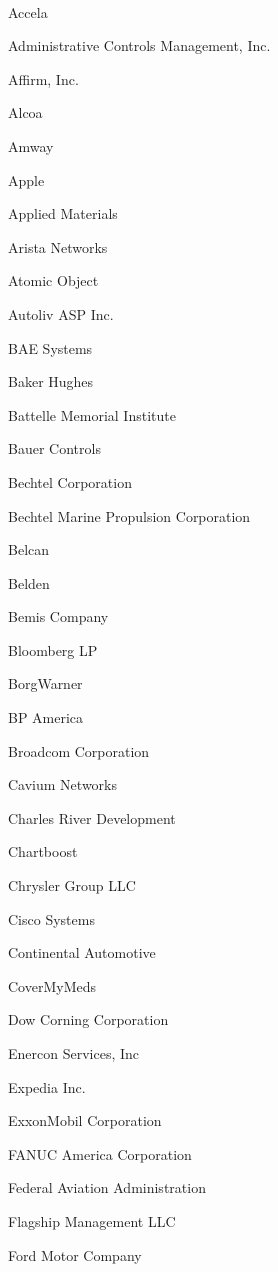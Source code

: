 \documentclass[twoside]{article}
\begin{document}
\begin{center}
\begin{multicols}{5}
        ~\hrulefill~
        \vspace{-.9em}
        \begin{FlushLeft}
        \begin{compactitem}
        \item Accela
\item Administrative Controls Management, Inc.
\item Affirm, Inc.
\item Alcoa
\item Amway
\item Apple
\item Applied Materials
\item Arista Networks
\item Atomic Object
\item Autoliv ASP Inc.
\item BAE Systems
\item Baker Hughes
\item Battelle Memorial Institute
\item Bauer Controls
\item Bechtel Corporation
\item Bechtel Marine Propulsion Corporation
\item Belcan
\item Belden
\item Bemis Company
\item Bloomberg LP
\item BorgWarner
\item BP America
\item Broadcom Corporation
\item Cavium Networks
\item Charles River Development
\item Chartboost
\item Chrysler Group LLC
\item Cisco Systems
\item Continental Automotive
\item CoverMyMeds
\item Dow Corning Corporation
\item Enercon Services, Inc
\item Expedia Inc.
\item ExxonMobil Corporation
\item FANUC America Corporation
\item Federal Aviation Administration
\item Flagship Management LLC
\item Ford Motor Company

\end{compactitem}
\end{FlushLeft}
\end{multicols}
\end{center}
\end{document}
